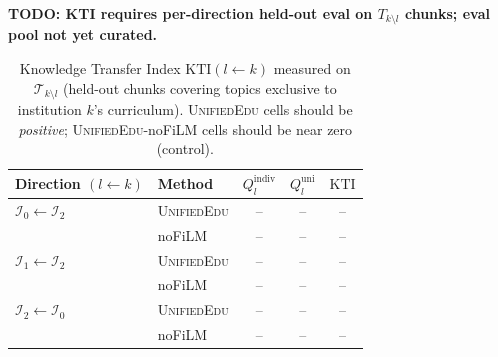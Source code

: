 \documentclass[11pt]{article}
\theoremstyle{plain}
\theoremstyle{definition}
\theoremstyle{remark}
\newcommand{\red}[1]{\textcolor{myred}{\textbf{#1}}}
\newcommand{\UniEdu}{\textsc{UnifiedEdu}}
\newcommand{\indiv}{\text{indiv}}
\newcommand{\uni}{\text{uni}}
\begin{document}
\red{TODO: KTI requires per-direction held-out eval on $T_{k\setminus l}$ chunks; eval pool not yet curated.}
\begin{table}[t]
\centering
\small
\caption{Knowledge Transfer Index $\mathrm{KTI}(l
\leftarrow k)$ measured on
$\mathcal{T}_{k\setminus l}$ (held-out chunks
covering topics exclusive to institution $k$'s
curriculum). \UniEdu{} cells should be
\emph{positive}; \UniEdu{}-noFiLM cells should be
near zero (control).}
\label{tab:kti}
\begin{tabular}{llccc}
\toprule
\textbf{Direction $(l \leftarrow k)$} & \textbf{Method} &
$Q_l^{\indiv}$ & $Q_l^{\uni}$ &
$\mathrm{KTI}$ \\
\midrule
$\mathcal{I}_0 \leftarrow \mathcal{I}_2$
  & \UniEdu{}  & -- & -- & -- \\
  & noFiLM     & -- & -- & -- \\
\midrule
$\mathcal{I}_1 \leftarrow \mathcal{I}_2$
  & \UniEdu{}  & -- & -- & -- \\
  & noFiLM     & -- & -- & -- \\
\midrule
$\mathcal{I}_2 \leftarrow \mathcal{I}_0$
  & \UniEdu{}  & -- & -- & -- \\
  & noFiLM     & -- & -- & -- \\
\bottomrule
\end{tabular}
\end{table}
\end{document}

